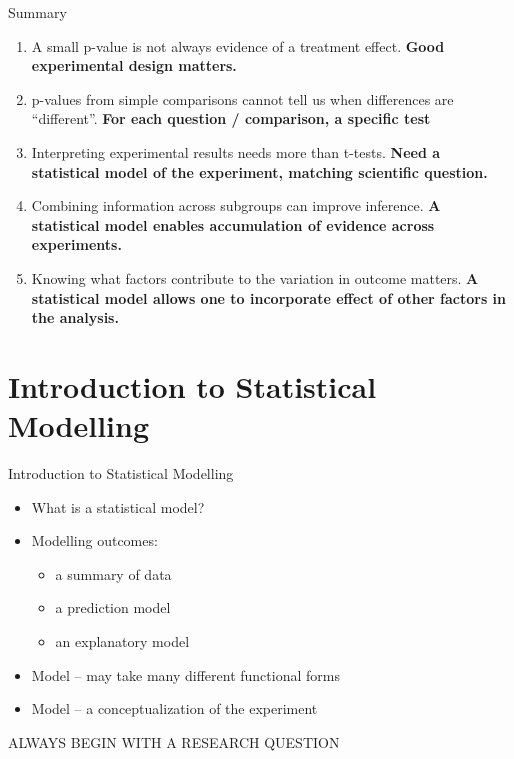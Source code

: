 \documentclass{beamer}
\begin{document}
\begin{frame}{Summary}
 \begin{enumerate}[<+->]
  \item A small p-value is not always evidence of a treatment effect. \textbf{Good experimental design matters.}
  \item p-values from simple comparisons cannot tell us when differences are “different”. \textbf{For each question / comparison, a specific test}
  \item Interpreting experimental results needs more than t-tests. \textbf{Need a statistical model of the experiment, matching scientific question.}
  \item Combining information across subgroups can improve inference. \textbf{A statistical model enables accumulation of evidence across experiments.}
  \item Knowing what factors contribute to the variation in outcome matters. \textbf{A statistical model allows one to incorporate effect of other factors in the analysis.}
 \end{enumerate}

\end{frame}

\section{Introduction to Statistical Modelling}

\begin{frame}{Introduction to Statistical Modelling}
 \begin{itemize}
  \item What is a statistical model?
  \item Modelling outcomes:
    \begin{itemize}
      \item a summary of data 
      \item a prediction model 
      \item an explanatory model
     \end{itemize}
  \item Model – may take many different functional forms
  \item Model – a conceptualization of the experiment 
 \end{itemize}
 \pause
ALWAYS BEGIN WITH A RESEARCH QUESTION
\end{frame}
\end{document}
